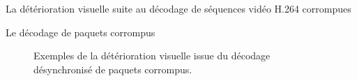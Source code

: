 \begin{chapter}{La détérioration visuelle suite au décodage de séquences vidéo H.264 corrompues}
\begin{section}{Le décodage de paquets corrompus}
\begin{figure}
	\caption[Détérioration visuelle issue d'un décodage désynchronisé] {Exemples de
la détérioration visuelle issue du décodage désynchronisé de paquets corrompus.}
	\label{fig-badImages}
\end{figure}


\end{section}
\end{chapter}
